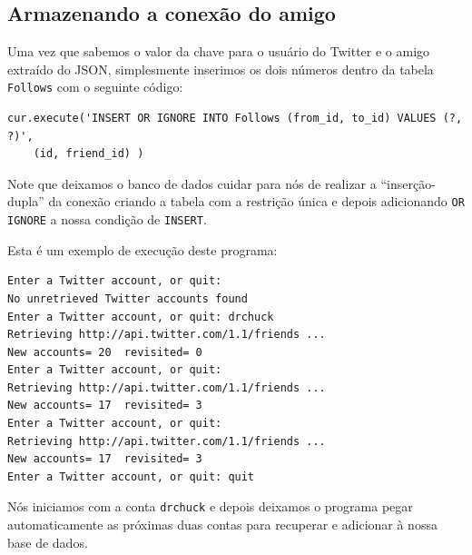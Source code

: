 \subsection{Armazenando a conexão do amigo}


Uma vez que sabemos o valor da chave para o usuário do Twitter e o amigo
extraído do JSON, simplesmente inserimos os dois números dentro da tabela
{\tt Follows} com o seguinte código:

\beforeverb
\begin{verbatim}
cur.execute('INSERT OR IGNORE INTO Follows (from_id, to_id) VALUES (?, ?)',
    (id, friend_id) )
\end{verbatim}
\afterverb
%
%
Note que deixamos o banco de dados cuidar para nós de realizar a
``inserção-dupla'' da conexão criando a tabela com a restrição única e depois
adicionando {\tt OR IGNORE} a nossa condição de {\tt INSERT}.

Esta é um exemplo de execução deste programa:

\beforeverb
\begin{verbatim}
Enter a Twitter account, or quit: 
No unretrieved Twitter accounts found
Enter a Twitter account, or quit: drchuck
Retrieving http://api.twitter.com/1.1/friends ...
New accounts= 20  revisited= 0
Enter a Twitter account, or quit: 
Retrieving http://api.twitter.com/1.1/friends ...
New accounts= 17  revisited= 3
Enter a Twitter account, or quit: 
Retrieving http://api.twitter.com/1.1/friends ...
New accounts= 17  revisited= 3
Enter a Twitter account, or quit: quit
\end{verbatim}
\afterverb
%

%
Nós iniciamos com a conta {\tt drchuck} e depois deixamos o programa pegar
automaticamente as próximas duas contas para recuperar e adicionar à nossa
base de dados.



